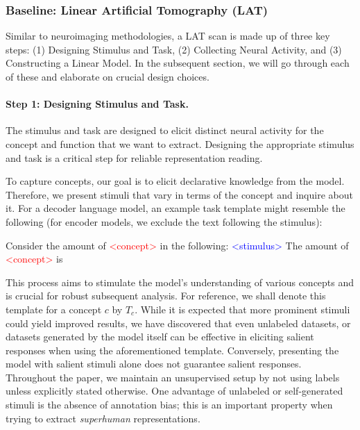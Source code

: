 \subsubsection{Baseline: Linear Artificial Tomography (LAT)} \label{subsec:lat_baseline}

Similar to neuroimaging methodologies, a LAT scan is made up of three key steps: (1) Designing Stimulus and Task, (2) Collecting Neural Activity, and (3) Constructing a Linear Model. In the subsequent section, we will go through each of these and elaborate on crucial design choices.

\paragraph{Step 1: Designing Stimulus and Task.}
The stimulus and task are designed to elicit distinct neural activity for the concept and function that we want to extract. Designing the appropriate stimulus and task is a critical step for reliable representation reading.

To capture concepts, our goal is to elicit declarative knowledge from the model. Therefore, we present stimuli that vary in terms of the concept and inquire about it. For a decoder language model, an example task template might resemble the following (for encoder models, we exclude the text following the stimulus):
\begin{FVerbatim}
Consider the amount of \textcolor{red}{<concept>} in the following:
\textcolor{blue}{<stimulus>}
The amount of \textcolor{red}{<concept>} is 
\end{FVerbatim}
This process aims to stimulate the model's understanding of various concepts and is crucial for robust subsequent analysis. For reference, we shall denote this template for a concept $c$ by $T_c$. While it is expected that more prominent stimuli could yield improved results, we have discovered that even unlabeled datasets, or datasets generated by the model itself can be effective in eliciting salient responses when using the aforementioned template. Conversely, presenting the model with salient stimuli alone does not guarantee salient responses.
Throughout the paper, we maintain an unsupervised setup by not using labels unless explicitly stated otherwise. One advantage of unlabeled or self-generated stimuli is the absence of annotation bias; this is an important property when trying to extract \emph{superhuman} representations.

